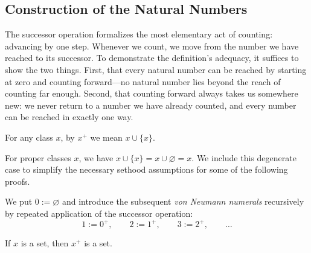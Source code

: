 
\subsection{Construction of the Natural Numbers}

 The successor operation formalizes the most elementary act of counting: advancing by one step. Whenever we count, we move from the number we have reached to its successor. To demonstrate the definition's adequacy, it suffices to show the two things. First, that every natural number can be reached by starting at zero and counting forward---no natural number lies beyond the reach of counting far enough. Second, that counting forward always takes us somewhere new: we never return to a number we have already counted, and every number can be reached in exactly one way.


\begin{definition}[Successor]
\label{def:successor}
For any class $x$, by $x^+$ we mean $x\cup\{x\}$.
\end{definition}

\begin{remark}
    For proper classes $x$, we have $x \cup \{x\} = x \cup \varnothing = x$. We include this degenerate case to simplify the necessary sethood assumptions for some of the following proofs.
\end{remark}

\begin{definition}
\label{def:von-neumann-numerals}
We put $0:=\varnothing$ and introduce the subsequent
\textit{von Neumann numerals} recursively by repeated
application of the successor operation:
\[
1:=0^+,\qquad
2:=1^+,\qquad
3:=2^+,\qquad \ldots
\]
\end{definition}


\begin{proposition}\label{prop:succ-are-sets}
    If $x$ is a set, then $x^+$ is a set.
\end{proposition}

